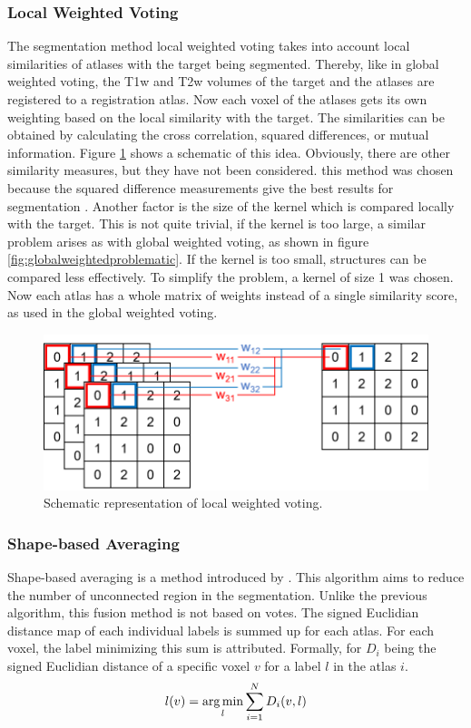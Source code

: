 \subsubsection*{Local Weighted Voting}
The segmentation method local weighted voting takes into account local similarities of atlases with the target being segmented. Thereby, like in global weighted voting, the T1w and T2w volumes of the target and the atlases are registered to a registration atlas. Now each voxel of the atlases gets its own weighting based on the local similarity with the target. The similarities can be obtained by calculating the cross correlation, squared differences, or mutual information. Figure \ref{fig:localWeightedVoting} shows a schematic of this idea. Obviously, there are other similarity measures, but they have not been considered. this method was chosen because the squared difference measurements give the best results for segmentation \cite{Artaechevarria2009}. Another factor is the size of the kernel which is compared locally with the target. This is not quite trivial, if the kernel is too large, a similar problem arises as with global weighted voting, as shown in figure \ref{fig:globalweightedproblematic}. If the kernel is too small, structures can be compared less effectively. To simplify the problem, a kernel of size 1 was chosen. Now each atlas has a whole matrix of weights instead of a single similarity score, as used in the global weighted voting.

\begin{figure}[h!]
	\centering
	\includegraphics[width=0.8\linewidth]{img/localWeighting}
	\caption{Schematic representation of local weighted voting.}
	\label{fig:localWeightedVoting}
\end{figure}

\subsubsection*{Shape-based Averaging}
Shape-based averaging is a method introduced by \cite{Rohlfing2007}. This algorithm aims to reduce the number of unconnected region in the segmentation. Unlike the previous algorithm, this fusion method is not based on votes. The signed Euclidian distance map of each individual labels is summed up for each atlas. For each voxel, the label minimizing this sum is attributed. Formally, for $D_i$ being the signed Euclidian distance of a specific voxel $v$ for a label $l$ in the atlas $i$.
\[ l(v) = \operatorname*{arg\,min}_l\sum_{i=1}^{N} D_i(v, l) \]

